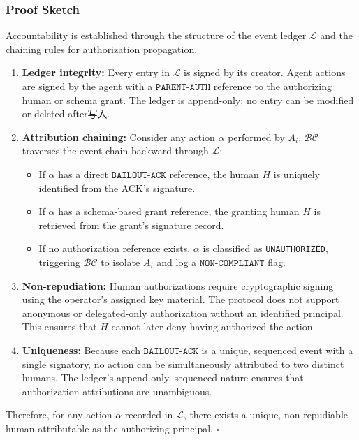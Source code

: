 \subsubsection{Proof Sketch}
Accountability is established through the structure of the event ledger $\mathcal{L}$ and the chaining rules for authorization propagation.

\begin{enumerate}
    \item \textbf{Ledger integrity:} Every entry in $\mathcal{L}$ is signed by its creator. Agent actions are signed by the agent with a $\texttt{PARENT-AUTH}$ reference to the authorizing human or schema grant. The ledger is append-only; no entry can be modified or deleted after写入.
    \item \textbf{Attribution chaining:} Consider any action $\alpha$ performed by $A_i$. $\mathcal{BC}$ traverses the event chain backward through $\mathcal{L}$:
    \begin{itemize}
        \item If $\alpha$ has a direct $\texttt{BAILOUT-ACK}$ reference, the human $H$ is uniquely identified from the ACK's signature.
        \item If $\alpha$ has a schema-based grant reference, the granting human $H$ is retrieved from the grant's signature record.
        \item If no authorization reference exists, $\alpha$ is classified as \texttt{UNAUTHORIZED}, triggering $\mathcal{BC}$ to isolate $A_i$ and log a $\texttt{NON-COMPLIANT}$ flag.
    \end{itemize}
    \item \textbf{Non-repudiation:} Human authorizations require cryptographic signing using the operator's assigned key material. The protocol does not support anonymous or delegated-only authorization without an identified principal. This ensures that $H$ cannot later deny having authorized the action.
    \item \textbf{Uniqueness:} Because each $\texttt{BAILOUT-ACK}$ is a unique, sequenced event with a single signatory, no action can be simultaneously attributed to two distinct humans. The ledger's append-only, sequenced nature ensures that authorization attributions are unambiguous.
\end{enumerate}

Therefore, for any action $\alpha$ recorded in $\mathcal{L}$, there exists a unique, non-repudiable human attributable as the authorizing principal. $\square$

